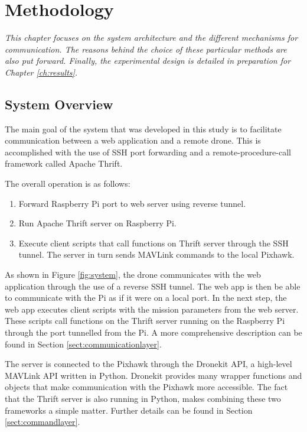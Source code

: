 \setlength{\footskip}{8mm}

\chapter{Methodology}
\label{ch:methodology}

\textit{This chapter focuses on the system architecture and the different mechanisms for communication. The reasons behind the choice of these particular methods are also put forward. Finally, the experimental design is detailed in preparation for Chapter \ref{ch:results}.
}

\section{System Overview}\label{sect:sysov}
The main goal of the system that was developed in this study is to facilitate communication between a web application and a remote drone. This is accomplished with the use of SSH port forwarding and a remote-procedure-call framework called Apache Thrift.

The overall operation is as follows:
\begin{enumerate}
  \item Forward Raspberry Pi port to web server using reverse tunnel.
  \item Run Apache Thrift server on Raspberry Pi.
  \item Execute client scripts that call functions on Thrift server through the SSH tunnel. The server in turn sends MAVLink commands to the local Pixhawk.
\end{enumerate}

As shown in Figure \ref{fig:system}, the drone communicates with the web application through the use of a reverse SSH tunnel. The web app is then be able to communicate with the Pi as if it were on a local port. In the next step, the web app executes client scripts with the mission parameters from the web server. These scripts call functions on the Thrift server running on the Raspberry Pi through the port tunnelled from the Pi. A more comprehensive description can be found in Section \ref{sect:communicationlayer}.

The server is connected to the Pixhawk through the Dronekit API, a high-level MAVLink API written in Python. Dronekit provides many wrapper functions and objects that make communication with the Pixhawk more accessible. The fact that the Thrift server is also running in Python, makes combining these two frameworks a simple matter. Further details can be found in Section \ref{sect:commandlayer}.

